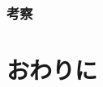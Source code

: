 \documentclass[T,J]{fose} %
\begin{document}
\subsubsection{考察}



\section{おわりに}







\end{document}
